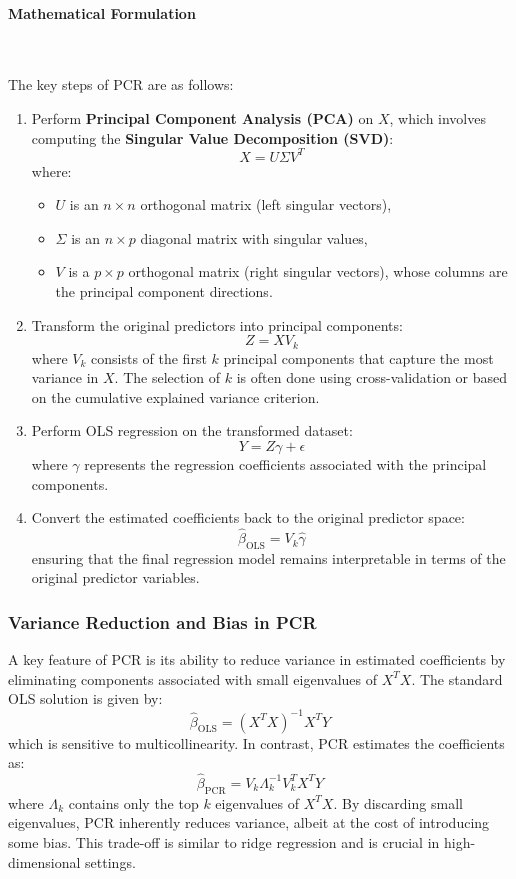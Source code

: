 \documentclass[11pt,twoside,a4paper]{article}
\begin{document}
\paragraph{Mathematical Formulation} \ \

The key steps of PCR are as follows:

\begin{enumerate}
    \item Perform \textbf{Principal Component Analysis (PCA)} on \( X \), which involves computing the \textbf{Singular Value Decomposition (SVD)}:
    \[
    X = U \Sigma V^T
    \]
    where:
    \begin{itemize}
        \item \( U \) is an \( n \times n \) orthogonal matrix (left singular vectors),
        \item \( \Sigma \) is an \( n \times p \) diagonal matrix with singular values,
        \item \( V \) is a \( p \times p \) orthogonal matrix (right singular vectors), whose columns are the principal component directions.
    \end{itemize}
    
    \item Transform the original predictors into principal components:
    \[
    Z = X V_k
    \]
    where \( V_k \) consists of the first \( k \) principal components that capture the most variance in \( X \). The selection of \( k \) is often done using cross-validation or based on the cumulative explained variance criterion.

    \item Perform OLS regression on the transformed dataset:
    \[
    Y = Z \gamma + \epsilon
    \]
    where \( \gamma \) represents the regression coefficients associated with the principal components.

    \item Convert the estimated coefficients back to the original predictor space:
    \[
    \hat{\beta}_{\text{OLS}} = V_k \hat{\gamma}
    \]
    ensuring that the final regression model remains interpretable in terms of the original predictor variables.
\end{enumerate}

\subsubsection{Variance Reduction and Bias in PCR}
A key feature of PCR is its ability to reduce variance in estimated coefficients by eliminating components associated with small eigenvalues of \( X^T X \). The standard OLS solution is given by:
\[
\hat{\beta}_{\text{OLS}} = (X^T X)^{-1} X^T Y
\]
which is sensitive to multicollinearity. In contrast, PCR estimates the coefficients as:
\[
\hat{\beta}_{\text{PCR}} = V_k \Lambda_k^{-1} V_k^T X^T Y
\]
where \( \Lambda_k \) contains only the top \( k \) eigenvalues of \( X^T X \). By discarding small eigenvalues, PCR inherently reduces variance, albeit at the cost of introducing some bias. This trade-off is similar to ridge regression and is crucial in high-dimensional settings.
\end{document}
